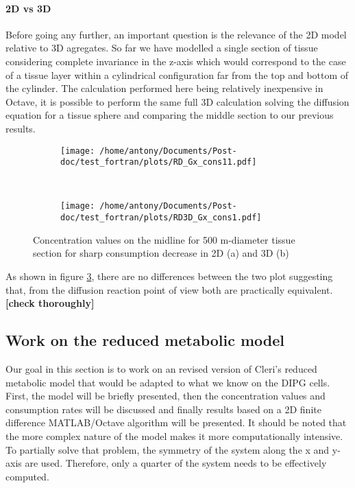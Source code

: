 \documentclass[11pt,a4paper]{article}
\begin{document}
\paragraph{2D vs 3D}
Before going any further, an important question is the relevance of the 2D model relative to 3D agregates. So far we have modelled a single section of tissue considering complete invariance in the z-axis which would correspond to the case of a tissue layer within a cylindrical configuration far from the top and bottom of the cylinder. The calculation performed here being relatively inexpensive in Octave, it is possible to perform the same full 3D calculation solving the diffusion equation for a tissue sphere and comparing the middle section to our previous results.  

\begin{figure}[ht!]
	\begin{subfigure}{0.45\textwidth}
	\centering
	\texttt{[image: /home/antony/Documents/Post-doc/test\_fortran/plots/RD\_Gx\_cons11.pdf]}
	\caption{ \label{RD_Gx_cons11}}
	\end{subfigure}
	~~
	\begin{subfigure}{0.45\textwidth}
	\texttt{[image: /home/antony/Documents/Post-doc/test\_fortran/plots/RD3D\_Gx\_cons1.pdf]}
		\caption{ \label{RD3D_Gx_cons1}}
	\end{subfigure}
	\caption{ Concentration values on the midline for 500 \textmu m-diameter tissue section for sharp consumption decrease in 2D (a) and 3D (b) \label{RD_cons111}}
\end{figure}  

As shown in figure \ref{RD_cons111}, there are no differences between the two plot suggesting that, from the diffusion reaction point of view both are practically equivalent. \textbf{[check thoroughly]}

 
\subsection{Work on the reduced metabolic model}
Our goal in this section is to work on an revised version of Cleri's reduced metabolic model that would  be adapted to what we know on the DIPG cells. First, the model will be briefly presented, then the concentration values and consumption rates will be discussed and finally results based on a 2D finite difference MATLAB/Octave algorithm will be presented. It should be noted that the more complex nature of the model makes it more computationally intensive. To partially solve that problem, the symmetry of the system along the x and y-axis are used. Therefore, only a quarter of the system needs to be effectively computed.
\end{document}
